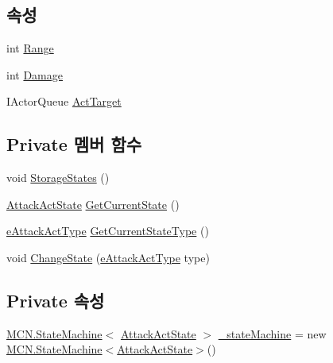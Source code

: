 \subsection*{속성}
\begin{DoxyCompactItemize}
\item 
int \hyperlink{class_attack_actor_aa331a3d1fbebd46a2458c64b209af927}{Range}
\item 
int \hyperlink{class_attack_actor_aaa126531b12eeb6d03311d761697cc84}{Damage}
\item 
I\+Actor\+Queue \hyperlink{class_m_c_n_1_1_actor_a1d809d2994dcccb6a8fcc665afa1ca6f}{Act\+Target}
\end{DoxyCompactItemize}
\subsection*{Private 멤버 함수}
\begin{DoxyCompactItemize}
\item 
void \hyperlink{class_attack_actor_a4c1408e09de62ad12b42bee3251556ba}{Storage\+States} ()
\item 
\hyperlink{class_attack_actor_1_1_attack_act_state}{Attack\+Act\+State} \hyperlink{class_attack_actor_ac231e370a4747dc36886f4158b289898}{Get\+Current\+State} ()
\item 
\hyperlink{_attack_actor_8cs_a10659ce944335df4ded984f6bc41f31b}{e\+Attack\+Act\+Type} \hyperlink{class_attack_actor_aab8bdc29ed7dae173129dbb09c9b8913}{Get\+Current\+State\+Type} ()
\item 
void \hyperlink{class_attack_actor_a97035efd9d67dd78cfa55cf321426567}{Change\+State} (\hyperlink{_attack_actor_8cs_a10659ce944335df4ded984f6bc41f31b}{e\+Attack\+Act\+Type} type)
\end{DoxyCompactItemize}
\subsection*{Private 속성}
\begin{DoxyCompactItemize}
\item 
\hyperlink{class_m_c_n_1_1_state_machine}{M\+C\+N.\+State\+Machine}$<$ \hyperlink{class_attack_actor_1_1_attack_act_state}{Attack\+Act\+State} $>$ \hyperlink{class_attack_actor_aefebe59645532f127c1504abb12ffac8}{\+\_\+state\+Machine} = new \hyperlink{class_m_c_n_1_1_state_machine}{M\+C\+N.\+State\+Machine}$<$\hyperlink{class_attack_actor_1_1_attack_act_state}{Attack\+Act\+State}$>$()
\end{DoxyCompactItemize}


